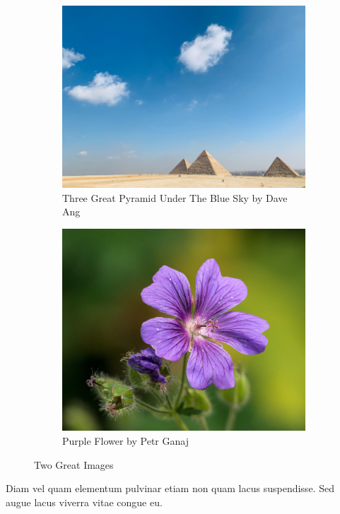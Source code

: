 \documentclass[12pt]{article}
\begin{document}
\begin{figure}[ht]
    \centering
    \begin{subfigure}{0.4\textwidth}
        \centering
        \includegraphics[width=\textwidth]{img/dave-ang-pyramid.jpg}
        \caption{Three Great Pyramid Under The Blue Sky by Dave Ang}
        \label{fig:great_pyramid}
    \end{subfigure}
    \hfill
    \begin{subfigure}{0.4\textwidth}
        \centering
        \includegraphics[width=\textwidth]{img/ganajp-purple-flower.jpg}
        \caption{Purple Flower by Petr Ganaj}
        \label{fig:purple_flower}
    \end{subfigure}
    \caption{Two Great Images}
    \label{fig:two_great_images}
\end{figure}


Diam vel quam elementum pulvinar etiam non quam lacus suspendisse.
Sed augue lacus viverra vitae congue eu.
\end{document}

